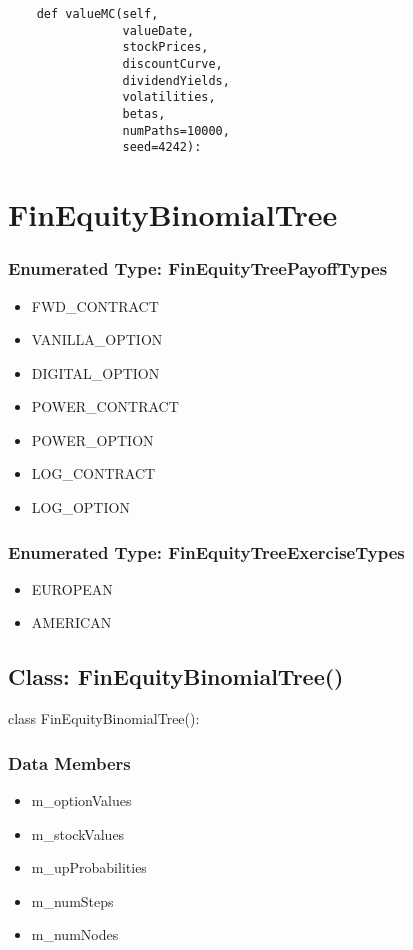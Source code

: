 \documentclass[twoside,11pt]{book}
\begin{document}
\begin{lstlisting}
    def valueMC(self,
                valueDate,
                stockPrices,
                discountCurve,
                dividendYields,
                volatilities,
                betas,
                numPaths=10000,
                seed=4242):
\end{lstlisting}

\newpage
\section{FinEquityBinomialTree}

\subsubsection{Enumerated Type: FinEquityTreePayoffTypes}
\begin{itemize}
\item{FWD\_CONTRACT}
\item{VANILLA\_OPTION}
\item{DIGITAL\_OPTION}
\item{POWER\_CONTRACT}
\item{POWER\_OPTION}
\item{LOG\_CONTRACT}
\item{LOG\_OPTION}
\end{itemize}

\subsubsection{Enumerated Type: FinEquityTreeExerciseTypes}
\begin{itemize}
\item{EUROPEAN}
\item{AMERICAN}
\end{itemize}

\subsection*{Class: FinEquityBinomialTree()}
class FinEquityBinomialTree(): 

\subsubsection*{Data Members}
\begin{itemize}
\item{m\_optionValues}
\item{m\_stockValues}
\item{m\_upProbabilities}
\item{m\_numSteps}
\item{m\_numNodes}
\end{itemize}
\end{document}
